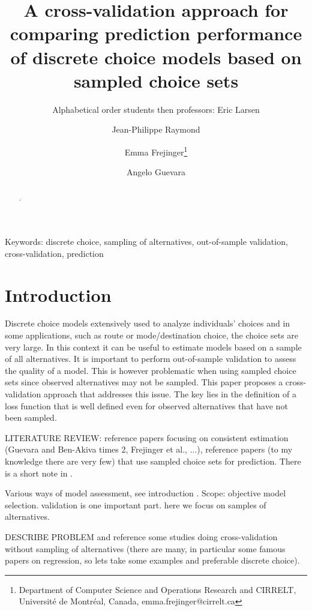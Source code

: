 \documentclass[12pt,a4paper]{article}
\begin{document}
\begin{titlepage}
\title{A cross-validation approach for comparing prediction performance of discrete choice models based on sampled choice sets}
  \author{Alphabetical order students then professors: Eric Larsen \and Jean-Philippe Raymond \and Emma Frejinger\footnote{Department of Computer Science and Operations Research and CIRRELT, Universit\'e de Montr\'eal, Canada, emma.frejinger@cirrelt.ca} \and Angelo Guevara}
\maketitle

\noindent Keywords: discrete choice, sampling of alternatives, out-of-sample validation, cross-validation, prediction

\begin{abstract}
.
\end{abstract}

\end{titlepage}


\section{Introduction} \label{sec:introduction}
Discrete choice models extensively used to analyze individuals' choices and in some applications, such as route or mode/destination choice, the choice sets are very large. In this context it can be useful to estimate models based on a sample of all alternatives. It is important to perform out-of-sample validation to assess the quality of a model. This is however problematic when using sampled choice sets since observed alternatives may not be sampled. This paper proposes a cross-validation approach that addresses this issue. The key lies in the definition of a loss function that is well defined even for observed alternatives that have not been sampled.

LITERATURE REVIEW: reference papers focusing on consistent estimation (Guevara and Ben-Akiva times 2, Frejinger et al., ...), reference papers (to my knowledge there are very few) that use sampled choice sets for prediction. There is a short note in \cite{BenALerm85}. 

Various ways of model assessment, see introduction \cite{KeanWolp07}. 
Scope: objective model selection. validation is one important part. here we focus on samples of alternatives.

DESCRIBE PROBLEM and reference some studies doing cross-validation without sampling of alternatives (there are many, in particular some famous papers on regression, so lets take some examples and preferable discrete choice).
\end{document}
